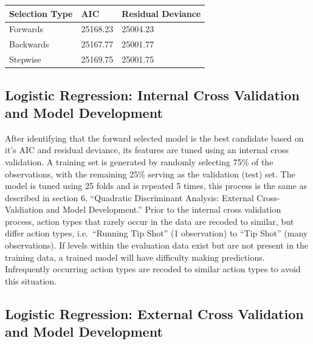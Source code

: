 \documentclass[american,]{article}
\begin{document}
\begin{table}[H]
\centering
\begin{tabular}{lll}
\toprule
Selection Type & AIC & Residual Deviance\\
\midrule
\rowcolor{gray!6}  Forwards & 25168.23 & 25004.23\\
Backwards & 25167.77 & 25001.77\\
\rowcolor{gray!6}  Stepwise & 25169.75 & 25001.75\\
\bottomrule
\end{tabular}
\end{table}

\hypertarget{logistic-regression-internal-cross-validation-and-model-development}{%
\subsection{\texorpdfstring{\textbf{Logistic Regression: Internal Cross Validation and Model Development}}{Logistic Regression: Internal Cross Validation and Model Development}}\label{logistic-regression-internal-cross-validation-and-model-development}}

After identifying that the forward selected model is the best candidate based on it's AIC and residual deviance, its features are tuned using an internal cross validation. A training set is generated by randomly selecting 75\% of the observations, with the remaining 25\% serving as the validation (test) set. The model is tuned using 25 folds and is repeated 5 times, this process is the same as described in section 6, ``Quadratic Discriminant Analysis: External Cross-Valdiation and Model Development.'' Prior to the internal cross validation process, action types that rarely occur in the data are recoded to similar, but differ action types, i.e.~``Running Tip Shot'' (1 observation) to ``Tip Shot'' (many observations). If levels within the evaluation data exist but are not present in the training data, a trained model will have difficulty making predictions. Infrequently occurring action types are recoded to similar action types to avoid this situation.

\hypertarget{logistic-regression-external-cross-validation-and-model-development}{%
\subsection{\texorpdfstring{\textbf{Logistic Regression: External Cross Validation and Model Development}}{Logistic Regression: External Cross Validation and Model Development}}\label{logistic-regression-external-cross-validation-and-model-development}}
\end{document}
